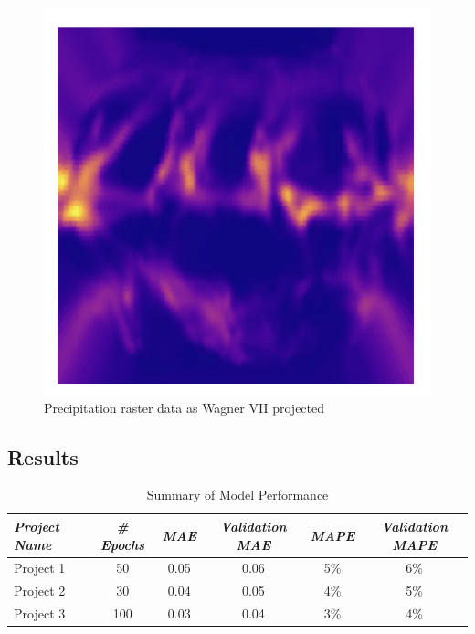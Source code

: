 \begin{figure}[H]
    \begin{minipage}{0.30\textwidth}
        \centering
        \includegraphics[width=0.9\linewidth]{figures/chapter-8/prect_wag.png}
        \caption{Precipitation raster data as Wagner VII projected}
        \label{fig:wag_prect_raster}
    \end{minipage}\hfill
\end{figure}

\subsection{Results}
\begin{table}[ht]
    \centering
    \caption{Summary of Model Performance}
    \label{planner_results_table}
    \renewcommand{\arraystretch}{1.2} %
    \begin{tabular}{|l|c|c|c|c|c|}
        \hline
        \rowcolor[gray]{0.9}
        \textbf{\emph{Project Name}} & \textbf{\emph{\# Epochs}} & \textbf{\emph{MAE}} & \textbf{\emph{Validation MAE}} & \textbf{\emph{MAPE}} & \textbf{\emph{Validation MAPE}} \\ \hline
        Project 1                    & 50                        & 0.05                & 0.06                           & 5\%                  & 6\%                             \\ \hline
        Project 2                    & 30                        & 0.04                & 0.05                           & 4\%                  & 5\%                             \\ \hline
        Project 3                    & 100                       & 0.03                & 0.04                           & 3\%                  & 4\%                             \\ \hline
    \end{tabular}
\end{table}
